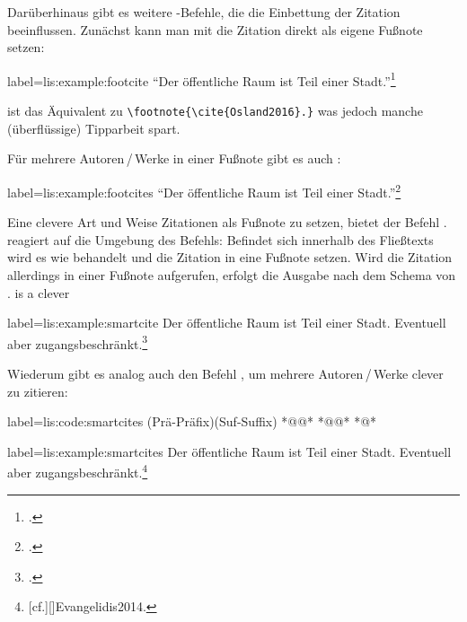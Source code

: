Darüberhinaus gibt es weitere -Befehle, 
die die Einbettung der Zitation beeinflussen. 
Zunächst kann man mit  die Zitation direkt als eigene Fußnote setzen:
\begin{lfgwexample}{label={lis:example:footcite}}
\enquote{Der öffentliche Raum ist Teil einer Stadt.}\footcite{Osland2016}
\end{lfgwexample}
 ist das Äquivalent zu \lstinline/\footnote{\cite{Osland2016}.}/
was jedoch manche (überflüssige) Tipparbeit spart.

Für mehrere Autoren\,/\,Werke in einer Fußnote gibt es auch :
\begin{lfgwexample}{label={lis:example:footcites}}
\enquote{Der öffentliche Raum ist Teil einer Stadt.}\footcites(s.)(){Osland2016}%
[vgl.][]{Evangelidis2014}
\end{lfgwexample}
 
 
Eine clevere Art und Weise Zitationen als Fußnote zu setzen,
bietet der Befehl .
  reagiert auf die Umgebung des Befehls:
 Befindet sich  innerhalb des Fließtexts wird es wie  behandelt 
 und die Zitation in eine Fußnote setzen. 
Wird die Zitation allerdings in einer Fußnote aufgerufen,
erfolgt die Ausgabe nach dem Schema von . 
 is a clever 

\begin{lfgwexample}{label={lis:example:smartcite}}
Der öffentliche Raum ist Teil einer Stadt.\smartcite{Osland2016} 
Eventuell aber zugangsbeschränkt.\footnote{\smartcite[vgl.][]{Evangelidis2014}.}
\end{lfgwexample}

Wiederum gibt es analog auch den Befehl , 
um mehrere Autoren\,/\,Werke clever zu zitieren:
\begin{lfgwcode}{label={lis:code:smartcites}}
\smartcites(Prä-Präfix)(Suf-Suffix)%
  *@@*%
  *@@*%
  *@\ldots@*
\end{lfgwcode}
\begin{lfgwexample}{label={lis:example:smartcites}}
Der öffentliche Raum ist Teil einer Stadt. 
Eventuell aber zugangsbeschränkt.\footnote{%
[cf.][]{Evangelidis2014}.}
\end{lfgwexample}

